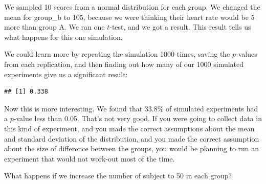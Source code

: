 \documentclass[
]{book}
\newenvironment{Shaded}{\begin{snugshade}}{\end{snugshade}}
\newcommand{\ControlFlowTok}[1]{\textcolor[rgb]{0.13,0.29,0.53}{\textbf{#1}}}
\newcommand{\DataTypeTok}[1]{\textcolor[rgb]{0.13,0.29,0.53}{#1}}
\newcommand{\DecValTok}[1]{\textcolor[rgb]{0.00,0.00,0.81}{#1}}
\newcommand{\FloatTok}[1]{\textcolor[rgb]{0.00,0.00,0.81}{#1}}
\newcommand{\KeywordTok}[1]{\textcolor[rgb]{0.13,0.29,0.53}{\textbf{#1}}}
\newcommand{\NormalTok}[1]{#1}
\newcommand{\OperatorTok}[1]{\textcolor[rgb]{0.81,0.36,0.00}{\textbf{#1}}}
\newcommand{\OtherTok}[1]{\textcolor[rgb]{0.56,0.35,0.01}{#1}}
\newcommand{\StringTok}[1]{\textcolor[rgb]{0.31,0.60,0.02}{#1}}
\begin{document}
We sampled 10 scores from a normal distribution for each group. We changed the mean for group\_b to 105, because we were thinking their heart rate would be 5 more than group A. We ran one \(t\)-test, and we got a result. This result tells us what happens for this one simulation.

We could learn more by repeating the simulation 1000 times, saving the \(p\)-values from each replication, and then finding out how many of our 1000 simulated experiments give us a significant result:

\begin{Shaded}
\end{Shaded}

\begin{verbatim}
## [1] 0.338
\end{verbatim}

Now this is more interesting. We found that 33.8\% of simulated experiments had a \(p\)-value less than 0.05. That's not very good. If you were going to collect data in this kind of experiment, and you made the correct assumptions about the mean and standard deviation of the distribution, and you made the correct assumption about the size of difference between the groups, you would be planning to run an experiment that would not work-out most of the time.

What happens if we increase the number of subject to 50 in each group?
\end{document}
